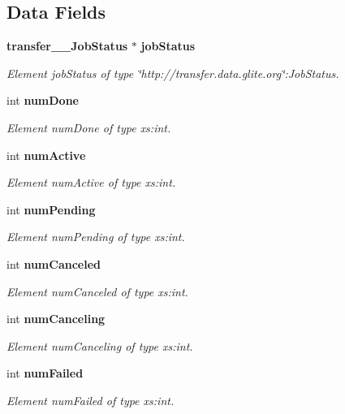 \subsection*{Data Fields}
\begin{DoxyCompactItemize}
\item 
{\bf transfer\_\-\_\-JobStatus} $\ast$ {\bf jobStatus}
\begin{DoxyCompactList}\small\item\em Element jobStatus of type \char`\"{}http://transfer.data.glite.org\char`\"{}:JobStatus. \item\end{DoxyCompactList}\item 
int {\bf numDone}
\begin{DoxyCompactList}\small\item\em Element numDone of type xs:int. \item\end{DoxyCompactList}\item 
int {\bf numActive}
\begin{DoxyCompactList}\small\item\em Element numActive of type xs:int. \item\end{DoxyCompactList}\item 
int {\bf numPending}
\begin{DoxyCompactList}\small\item\em Element numPending of type xs:int. \item\end{DoxyCompactList}\item 
int {\bf numCanceled}
\begin{DoxyCompactList}\small\item\em Element numCanceled of type xs:int. \item\end{DoxyCompactList}\item 
int {\bf numCanceling}
\begin{DoxyCompactList}\small\item\em Element numCanceling of type xs:int. \item\end{DoxyCompactList}\item 
int {\bf numFailed}
\begin{DoxyCompactList}\small\item\em Element numFailed of type xs:int. \item\end{DoxyCompactList}\item 

\end{DoxyCompactItemize}
